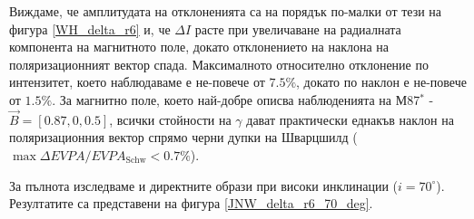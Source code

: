 Виждаме, че амплитудата на отклоненията са на порядък по-малки от тези на фигура \ref{WH_delta_r6} и, че $\Delta I$ расте при увеличаване на радиалната компонента на магнитното поле, докато отклонението на наклона на поляризационният вектор спада. Максималното относително отклонение по интензитет, което наблюдаваме е не-повече от $7.5\%$, докато по наклон е не-повече от $1.5\%$. За магнитно поле, което най-добре описва наблюденията на М87$^*$ - $\vec{B} = [0.87, 0, 0.5]$, всички стойности на $\gamma$ дават практически еднакъв наклон на поляризационния вектор спрямо черни дупки на Шварцшилд ($\max \Delta EVPA / EVPA_\text{Schw}<0.7\%$).\newpage

За пълнота изследваме и директните образи при високи инклинации ($i = 70^\circ$). Резултатите са представени на фигура \ref{JNW_delta_r6_70_deg}.

